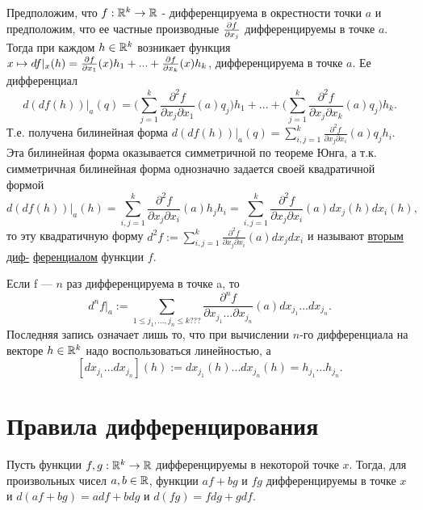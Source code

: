     Предположим, что $f : \mathbb R^k \rightarrow \mathbb R$ - дифференцируема в окрестности точки $a$ и предположим, что ее частные производные $\pdv{f}{x_j}$ дифференцируемы в точке $a$. Тогда при каждом $h \in \mathbb R^k$ возникает функция $x \mapsto df|_x (h) = \frac{\partial f}{\partial x_1}(x) h_1 + ... + \frac{\partial f}{\partial x_k}(x) h_k$, дифференцируема в точке $a$. Ее дифференциал
    \[ d(df(h))|_a (q) = \bigg(\sum_{j = 1}^k \frac{\partial^2 f}{\partial x_j \partial x_1}(a) q_j \bigg) h_1 + ... + \bigg(\sum_{j = 1}^k \frac{\partial^2 f}{\partial x_j \partial x_k}(a) q_j \bigg) h_k. \]
    Т.е. получена билинейная форма $d(df(h))|_a (q) = \sum_{i, j = 1}^k \frac{\partial^2 f}{\partial x_j \partial x_i}(a) q_j h_i$. Эта билинейная форма оказывается симметричной по теореме Юнга, а т.к. симметричная билинейная форма однозначно задается своей квадратичной формой
    \[ d(df(h))|_a (h) = \sum_{i, j = 1}^k \frac{\partial^2 f}{\partial x_j \partial x_i}(a) h_j h_i = \sum_{i, j = 1}^k \frac{\partial^2 f}{\partial x_j \partial x_i}(a) dx_j(h) dx_i(h),\]
    то эту квадратичную форму $d^2 f := \sum_{i,j = 1}^k \frac{\partial^2 f}{\partial x_j \partial x_i}(a) dx_j dx_i$ и называют \underline{вторым диф-} \underline{ференциалом} функции $f$.
    
    \begin{definition}
    	Если f — $n$ раз дифференцируема в точке a, то
    	\[  d^n f|_a := \sum_{1 \leqslant j_1, ..., j_n \leqslant k???} \frac{\partial^n f}{\partial x_{j_1} ... \partial x_{j_n}}(a) dx_{j_1} ... dx_{j_n}. \]
    	Последняя запись означает лишь то, что при вычислении $n$-го дифференциала на векторе $h \in \mathbb R^k$ надо воспользоваться линейностью, а
    	\[ [dx_{j_1} ... dx_{j_n}](h) := dx_{j_1}(h) ... dx_{j_n}(h) = h_{j_1} ... h_{j_n}. \]
    \end{definition}
    
    \section{Правила дифференцирования}
    
    \begin{theorem}
    	Пусть функции $f, g : \mathbb R^k \rightarrow \mathbb R$ дифференцируемы в некоторой точке $x$. Тогда, для произвольных чисел $a, b \in \mathbb R$, функции $af + bg$ и $fg$ дифференцируемы в точке $x$ и $d(af + bg) = adf + bdg$ и $d(fg) = fdg + gdf$.
    \end{theorem}
    
